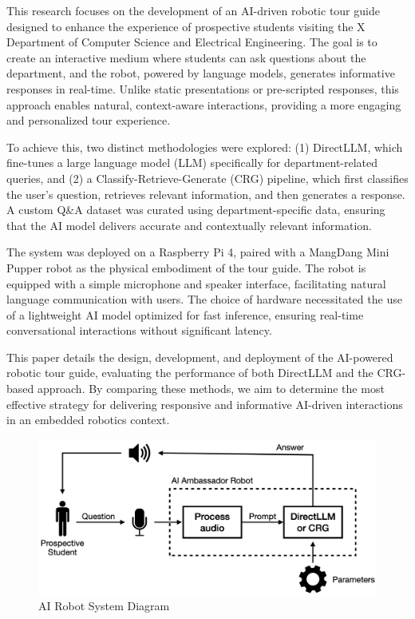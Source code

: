 \documentclass[conference]{IEEEtran}
\begin{document}
This research focuses on the development of an AI-driven robotic tour guide designed to enhance the experience of prospective students visiting the X Department of Computer Science and Electrical Engineering. 
The goal is to create an interactive medium where students can ask questions about the department, and the robot, powered by language models, generates informative responses in real-time. 
Unlike static presentations or pre-scripted responses, this approach enables natural, context-aware interactions, providing a more engaging and personalized tour experience.

To achieve this, two distinct methodologies were explored: 
(1) DirectLLM, which fine-tunes a large language model (LLM) specifically for department-related queries, and 
(2) a Classify-Retrieve-Generate (CRG) pipeline, which first classifies the user's question, retrieves relevant information, and then generates a response. 
A custom Q\&A dataset was curated using department-specific data, ensuring that the AI model delivers accurate and contextually relevant information.

The system was deployed on a Raspberry Pi 4, paired with a MangDang Mini Pupper \cite{b1} robot as the physical embodiment of the tour guide. 
The robot is equipped with a simple microphone and speaker interface, facilitating natural language communication with users. 
The choice of hardware necessitated the use of a lightweight AI model optimized for fast inference, ensuring real-time conversational interactions without significant latency.

This paper details the design, development, and deployment of the AI-powered robotic tour guide, evaluating the performance of both DirectLLM and the CRG-based approach. 
By comparing these methods, we aim to determine the most effective strategy for delivering responsive and informative AI-driven interactions in an embedded robotics context.

\begin{figure}[t]
    \centering
    \includegraphics[width=0.70\linewidth]{assets/system_diagram.png}
    \caption{AI Robot System Diagram}
    \label{fig:system}
\end{figure}
\end{document}
